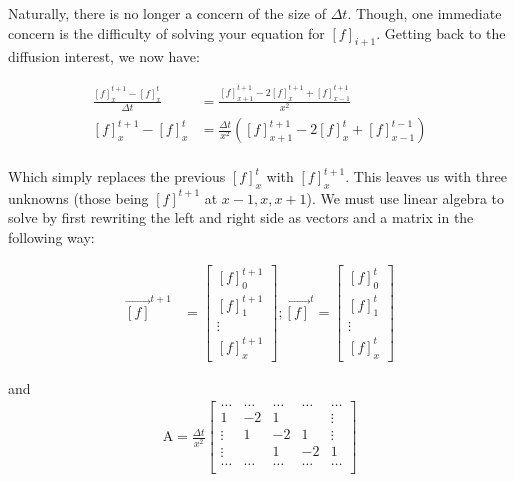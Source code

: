 \documentclass[12pt]{report}
\newcommand{\pr}[1]{\left(#1\right)}
\begin{document}
Naturally, there is no longer a concern of the size of $\Delta t$. Though, one immediate concern is the difficulty of solving your equation for $[f]_{i+1}$. Getting back to the diffusion interest, we now have:

\begin{equation} \label{diff6}
\begin{split}
\frac{[f]^{t+1}_{x} - [f]^{t}_{x}}{\Delta t} &= \frac{[f]^{t+1}_{x+1} - 2[f]^{t+1}_x + [f]^{t+1}_{x - 1}}{x^2}\\
[f]^{t+1}_{x} - [f]^{t}_{x} &= \frac{\Delta t}{x^2} \pr{[f]^{t+1}_{x+1} - 2[f]^{t}_x + [f]^{t-1}_{x - 1}} \\
\end{split}
\end{equation}


Which simply replaces the previous $[f]^{t}_{x}$ with $[f]^{t+1}_{x}$. This leaves us with three unknowns (those being $[f]^{t+1}$ at $x-1,x,x+1$). We must use linear algebra to solve by first rewriting the left and right side as vectors and a matrix in the following way: 

\begin{align}
\vec{[f]}^{t+1} &= \begin{bmatrix}
        [f]^{t+1}_{0} \\
        [f]^{t+1}_{1} \\
        \vdots \\
        [f]^{t+1}_{x}
\end{bmatrix}
; \vec{[f]}^{t} = \begin{bmatrix}
        [f]^{t}_{0} \\
        [f]^{t}_{1} \\
        \vdots \\
        [f]^{t}_{x}
\end{bmatrix}
\end{align}

and 
\begin{align}
\mathrm{A} = \frac{\Delta t}{x^2}
\begin{bmatrix} %
\dots       &   \dots       & \dots     &   \dots    &   \dots   \\
1           &   -2          & 1         &            &   \vdots    \\
\vdots      &   1           & -2        &   1        &   \vdots   \\   
\vdots      &               & 1         &   -2       &   1    \\
\dots       &   \dots       & \dots     &   \dots    &   \dots    \\
\end{bmatrix}
\end{align}
\end{document}
